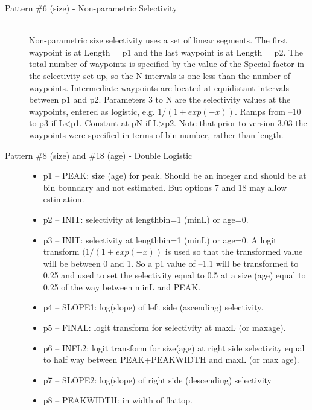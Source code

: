 \begin{description}
	\item[Pattern \#6 (size) - Non-parametric Selectivity]\hfil\\
	Non-parametric size selectivity uses a set of linear segments.  The first waypoint is at Length = p1 and the last waypoint is at Length = p2.  The total number of waypoints is specified by the value of the Special factor in the selectivity set-up, so the N intervals is one less than the number of waypoints.  Intermediate waypoints are located at equidistant intervals between p1 and p2.  Parameters 3 to N are the selectivity values at the waypoints, entered as logistic, e.g. $1/(1+exp(-x))$.  Ramps from –10 to p3 if L<p1.  Constant at pN if L>p2.  Note that prior to version 3.03 the waypoints were specified in terms of bin number, rather than length.
\end{description}

\begin{description}
	\item[Pattern \#8 (size) and \#18 (age) - Double Logistic]\hfil
	\begin{itemize}
		\item  p1 – PEAK:  size (age) for peak. Should be an integer and should be at bin boundary and not estimated.  But options 7 and 18 may allow estimation.
		\item p2 – INIT:  selectivity at lengthbin=1 (minL) or age=0.
		\item p3 – INIT:  selectivity at lengthbin=1 (minL) or age=0. A logit transform $(1/(1+exp(-x))$ is used so that the transformed value will be between 0 and 1.  So a p1 value of –1.1 will be transformed to 0.25 and used to set the selectivity equal to 0.5 at a size (age) equal to 0.25 of the way between minL and PEAK. 
		\item p4 – SLOPE1:  log(slope) of left side (ascending) selectivity.
		\item p5 – FINAL:  logit transform for selectivity at maxL (or maxage).
		\item p6 – INFL2:  logit transform for size(age) at right side selectivity equal to half way between PEAK+PEAKWIDTH and maxL (or max age).
		\item p7 – SLOPE2:  log(slope) of right side (descending) selectivity
		\item p8 – PEAKWIDTH:  in width of flattop.
	\end{itemize}
\end{description}

